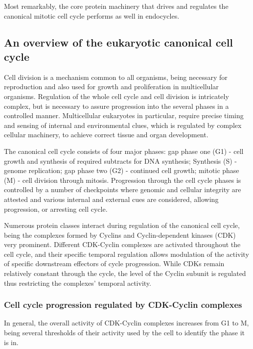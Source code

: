 \documentclass[11pt,twoside,a4paper]{report}
\begin{document}
		Most remarkably, the core protein machinery that drives and regulates the canonical mitotic cell cycle performs as well in endocycles.
		
			\subsection{An overview of the eukaryotic canonical cell cycle}
			Cell division is a mechanism common to all organisms, being necessary for reproduction and also used for growth and proliferation in multicellular organisms. Regulation of the whole cell cycle and cell division is intricately complex, but is necessary to assure progression into the several phases in a controlled manner. Multicellular eukaryotes in particular, require precise timing and sensing of internal and environmental clues, which is regulated by complex cellular machinery, to achieve correct tissue and organ development.
			
			The canonical cell cycle consists of four major phases: gap phase one (G1) - cell growth and synthesis of required subtracts for DNA synthesis; Synthesis (S) - genome replication; gap phase two (G2) - continued cell growth; mitotic phase (M) - cell division through mitosis. Progression through the cell cycle phases is controlled by a number of checkpoints where genomic and cellular integrity are attested and various internal and external cues are considered, allowing progression, or arresting cell cycle.
			
			Numerous protein classes interact during regulation of the canonical cell cycle, being the complexes formed by Cyclins and Cyclin-dependent kinases (CDK) very prominent. Different CDK-Cyclin complexes are activated throughout the cell cycle, and their specific temporal regulation allows modulation of the activity of specific downstream effectors of cycle progression. While CDKs remain relatively constant through the cycle, the level of the Cyclin subunit is regulated thus restricting the complexes' temporal activity. 
			
				\subsubsection{Cell cycle progression regulated by CDK-Cyclin complexes}
				In general, the overall activity of CDK-Cyclin complexes increases from G1 to M, being several thresholds of their activity used by the cell to identify the phase it is in.
								
\end{document}
